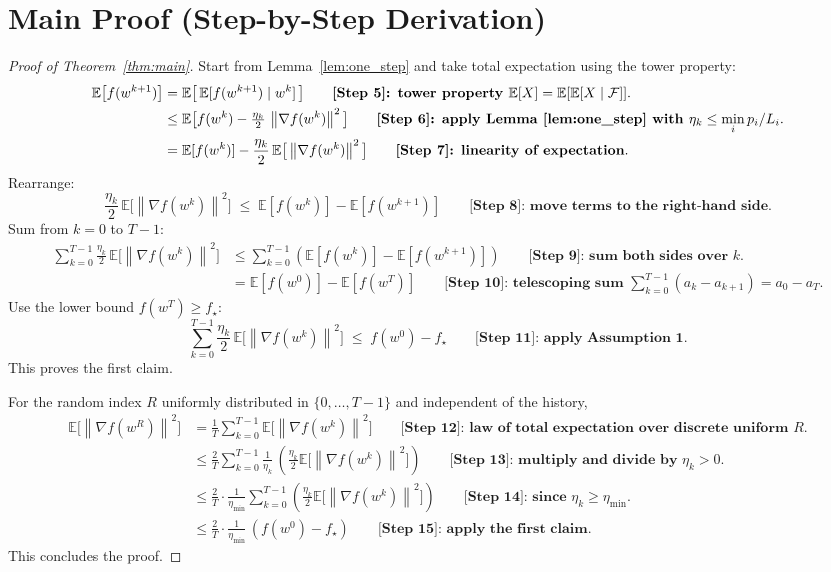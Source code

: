 \documentclass[11pt]{article}
\newcommand{\E}{\mathbb{E}}
\newcommand{\1}{\mathbbm{1}}
\newcommand{\norm}[1]{\left\lVert #1 \right\rVert}
\begin{document}
\section*{Main Proof (Step-by-Step Derivation)}
\begin{proof}[Proof of Theorem~\ref{thm:main}]
Start from Lemma~\ref{lem:one_step} and take total expectation using the tower property:
\begin{align*}
\E\big[f(w^{k+1})\big]
&= \E\big[\,\E[f(w^{k+1})\mid w^k]\,\big]
\qquad\textbf{[Step 5]: tower property } \E[X]=\E[\E[X\mid\mathcal{F}]].
\\
&\le \E\big[f(w^k) - \tfrac{\eta_k}{2}\,\norm{\nabla f(w^k)}^2\big]
\qquad\textbf{[Step 6]: apply Lemma \ref{lem:one_step} with }\eta_k \le \min_i p_i/L_i.
\\
&= \E[f(w^k)] - \frac{\eta_k}{2}\,\E\big[\norm{\nabla f(w^k)}^2\big]
\qquad\textbf{[Step 7]: linearity of expectation}.
\end{align*}
Rearrange:
\[
\frac{\eta_k}{2}\,\E\big[\norm{\nabla f(w^k)}^2\big]
\;\le\;
\E[f(w^k)] - \E[f(w^{k+1})]
\qquad\textbf{[Step 8]: move terms to the right-hand side}.
\]
Sum from $k=0$ to $T-1$:
\begin{align*}
\sum_{k=0}^{T-1} \frac{\eta_k}{2}\,\E\big[\norm{\nabla f(w^k)}^2\big]
&\le \sum_{k=0}^{T-1} \left(\E[f(w^k)] - \E[f(w^{k+1})]\right)
\qquad\textbf{[Step 9]: sum both sides over }k.
\\
&= \E[f(w^0)] - \E[f(w^T)]
\qquad\textbf{[Step 10]: telescoping sum } \sum_{k=0}^{T-1}(a_k-a_{k+1})=a_0-a_T.
\end{align*}
Use the lower bound $f(w^T)\ge f_\star$:
\[
\sum_{k=0}^{T-1} \frac{\eta_k}{2}\,\E\big[\norm{\nabla f(w^k)}^2\big]
\;\le\; f(w^0) - f_\star
\qquad\textbf{[Step 11]: apply Assumption 1}.
\]
This proves the first claim.

For the random index $R$ uniformly distributed in $\{0,\dots,T-1\}$ and independent of the history,
\begin{align*}
\E\big[\norm{\nabla f(w^R)}^2\big]
&= \frac{1}{T}\sum_{k=0}^{T-1} \E\big[\norm{\nabla f(w^k)}^2\big]
\qquad\textbf{[Step 12]: law of total expectation over discrete uniform }R.
\\
&\le \frac{2}{T}\sum_{k=0}^{T-1} \frac{1}{\eta_k}\,\left( \frac{\eta_k}{2}\E\big[\norm{\nabla f(w^k)}^2\big]\right)
\qquad\textbf{[Step 13]: multiply and divide by }\eta_k>0.
\\
&\le \frac{2}{T}\cdot \frac{1}{\eta_{\min}} \sum_{k=0}^{T-1} \left( \frac{\eta_k}{2}\E\big[\norm{\nabla f(w^k)}^2\big]\right)
\qquad\textbf{[Step 14]: since }\eta_k\ge \eta_{\min}.
\\
&\le \frac{2}{T}\cdot \frac{1}{\eta_{\min}} \,(f(w^0)-f_\star)
\qquad\textbf{[Step 15]: apply the first claim}.
\end{align*}
This concludes the proof.
\end{proof}
\end{document}
